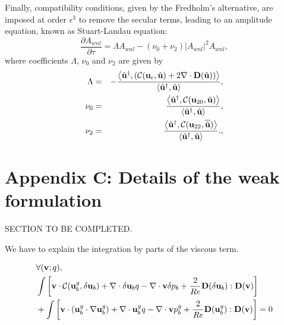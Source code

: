 \documentclass[twocolumn,10pt]{asme2ej}
\newcommand{\be}[1]{ \begin{equation} \label{#1}}
\newcommand{\ee}{\end{equation}}
\begin{document}
Finally, compatibility conditions, {\color{red}given by the Fredholm's alternative, are imposed at order $\epsilon^3$ to remove the secular terms, leading to an amplitude equation, known as Stuart-Landau equation:
\be{WNL3_2}
\frac{\partial A_{wnl}}{\partial \tau} = \Lambda A_{wnl} - (\nu_0+\nu_2)  |A_{wnl}|^2 A_{wnl},
\ee
}
where coefficients $\Lambda$, $\nu_0$ and $\nu_2$ are given by
{\color{red}
\begin{eqnarray}
\Lambda &=& -\frac{ \left< {\hat{\bf u}}^\dag, 
\left( {\cal C}({\bf u}_\epsilon, \hat{\bf u}) + 2 \nabla \cdot  {\bf D}( \hat{\bf u}) \right) \right>}
{  \left<  \hat{\bf u}^\dag,\hat{\bf u} \right> },\label{LAMBDA}\\
\nu_0 &=& \frac{ \left< {\hat{\bf u}}^\dag,  {\cal C}({\bf u}_{20}, \hat{\bf u} ) \right>}
{  \left<  \hat{\bf u}^\dag,\hat{\bf u} \right> },\label{NU0}\\
\nu_2 &=& \frac{ \left< {\hat{\bf u}}^\dag,  {\cal C}({\bf u}_{22}, \overline{\hat{\bf u}})  \right>}
{  \left<  \hat{\bf u}^\dag,\hat{\bf u} \right> }.,\label{NU2}
 \end{eqnarray}
}

\section*{{\color{red}Appendix C: } Details of the weak formulation}

SECTION TO BE COMPLETED.

We have to explain the integration by parts of the viscous term.




\begin{eqnarray}
\label{NewtonWeak}
&\forall ({\bf v};q), \\
\displaystyle &\int \left[ {\bf v} \cdot {\cal C}( {\bf u}_b^g , \delta {\bf u}_b) +  \nabla  \cdot \delta {\bf u}_b q -\nabla  \cdot {\bf v} \delta p_b
+ \frac{2}{Re} {\bf D}(\delta {\bf u}_b) : {\bf D}({\bf v}) \right]
\nonumber
\\
\nonumber
\displaystyle & + \int \left[ {\bf v} \cdot ( {\bf u}_b^g \cdot \nabla {\bf u}_b^g) 
+ \nabla \cdot {\bf u}_b^g  q 
- \nabla \cdot {\bf v} p_b^g
+ \frac{2}{Re} {\bf D}({\bf u}_b^g) : {\bf D}({\bf v}) \right] = 0 
\end{eqnarray}





\end{document}

